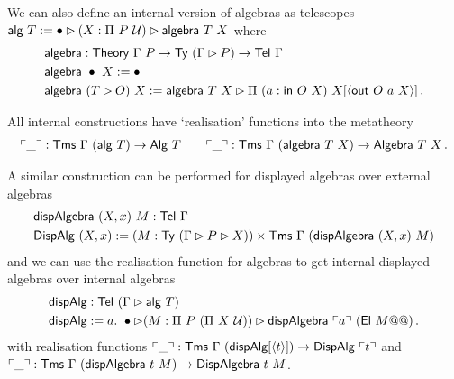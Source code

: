 We can also define an internal version of algebras as telescopes
$\mta{alg}\ T := \bullet \rhd (X : \Pi\ P\ \univ) \rhd \mta{algebra}\ T\ X$ where
\begin{align*}
    &\mta{algebra} : \mta{Theory}\ \Gamma\ P \to \Ty\ (\Gamma \rhd P) \to \Tel\ \Gamma \\
    &\mta{algebra}\ \bullet\ X := \bullet \\
    &\mta{algebra}\ (T \rhd O)\ X := \mta{algebra}\ T\ X \rhd \Pi\ (a : \mta{in}\ O\ X)\ X[\Msub{\mta{out}\ O\ a\ X}] \,.
\end{align*}

All internal constructions have `realisation' functions into the metatheory
\begin{align*}
    \ulcorner \_ \urcorner : \textsf{Tms}\ \Gamma\ (\textsf{alg}\ T) \to \textsf{Alg}\ T \qquad \ulcorner \_ \urcorner : \textsf{Tms}\ \Gamma\ (\textsf{algebra}\ T\ X) \to \textsf{Algebra}\ T\ X \,.
\end{align*}


A similar construction can be performed for displayed algebras over external algebras
\begin{align*}
&\textsf{dispAlgebra}\ (X, x)\ M : \textsf{Tel}\ \Gamma \\
&\textsf{DispAlg}\ (X, x) := (M : \textsf{Ty}\ (\Gamma \rhd P \rhd X)) \times \textsf{Tms}\ \Gamma\ (\textsf{dispAlgebra}\ (X, x)\ M)
\end{align*}
and we can use the realisation function for algebras to get internal displayed
algebras over internal algebras
\begin{align*}
    &\textsf{dispAlg} : \textsf{Tel}\ (\Gamma \rhd \textsf{alg}\ T) \\
    &\textsf{dispAlg} := a.\ \bullet \rhd (M : \Pi\ P\ (\Pi\ X\ \mathcal{U})) \rhd \textsf{dispAlgebra}\ \ulcorner a \urcorner\ (\textsf{El}\ M@@) \,.
\end{align*}
with realisation functions $\ulcorner \_ \urcorner : \textsf{Tms}\ \Gamma\ (\textsf{dispAlg}[\langle t\rangle]) \to \textsf{DispAlg}\ \ulcorner t \urcorner$ and
$\ulcorner \_ \urcorner : \textsf{Tms}\ \Gamma\ (\textsf{dispAlgebra}\ t\ M) \to \textsf{DispAlgebra}\ t\ M$.

